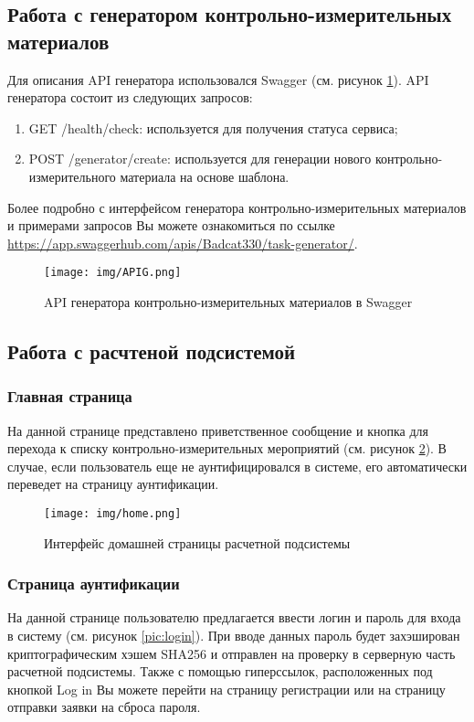 \documentclass[a4paper,12pt,reqno]{article}
\begin{document}
    \subsection{Работа с генератором контрольно-измерительных материалов}
    Для описания API генератора использовался Swagger (см. рисунок \ref{pic:apig}). API генератора состоит из следующих запросов:
    \begin{enumerate}
        \item GET /health/check: используется для получения статуса сервиса;
        \item POST /generator/create: используется для генерации нового контрольно-измерительного материала на основе шаблона.
    \end{enumerate}
    Более подробно с интерфейсом генератора контрольно-измерительных материалов и примерами запросов Вы можете ознакомиться по ссылке \url{https://app.swaggerhub.com/apis/Badcat330/task-generator/}.

    \begin{figure}[H]
        \centering
        \texttt{[image: img/APIG.png]}
        \caption{API генератора контрольно-измерительных материалов в Swagger}
        \label{pic:apig}
    \end{figure}

    \subsection{Работа с расчтеной подсистемой}

    \subsubsection{Главная страница}

    На данной странице представлено приветственное сообщение и кнопка для перехода к списку контрольно-измерительных мероприятий (см. рисунок \ref{pic:home}). В случае, если пользователь еще не аунтифицировался в системе, его автоматически переведет на страницу аунтификации.

    \begin{figure}[H]
        \centering
        \texttt{[image: img/home.png]}
        \caption{Интерфейс домашней страницы расчетной подсистемы}
        \label{pic:home}
    \end{figure}

    \subsubsection{Страница аунтификации}
    На данной странице пользователю предлагается ввести логин и пароль для входа в систему (см. рисунок \ref{pic:login}). При вводе данных пароль будет захэширован криптографическим хэшем SHA256 и отправлен на проверку в серверную часть расчетной подсистемы. Также с помощью гиперссылок, расположенных под кнопкой Log in Вы можете перейти на страницу регистрации или на страницу отправки заявки на сброса пароля.
\end{document}
